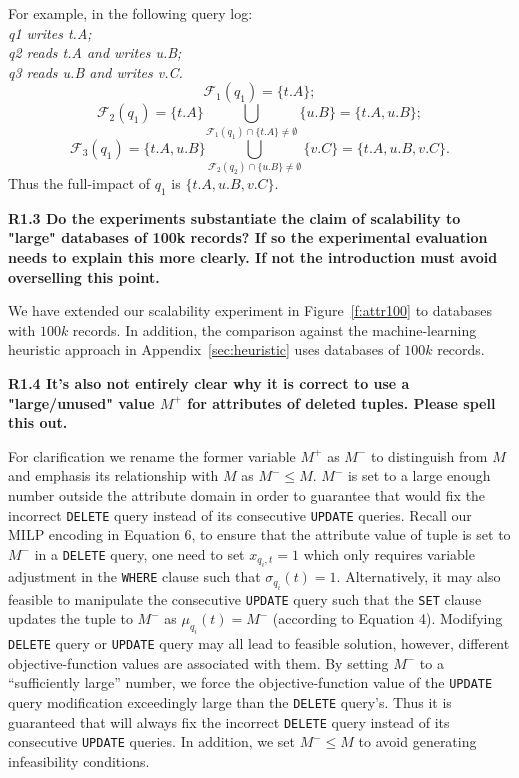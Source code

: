 \noindent For example, in the following query log:\\
\textit{q1 writes t.A; \\
q2 reads t.A and writes u.B; \\
q3 reads u.B and writes v.C.}\\
\[\mathcal{F}_1(q_1) = \{t.A\};\] 
\[\mathcal{F}_2(q_1) = \{t.A\} \bigcup_{\mathcal{F}_1(q_1) \cap \{t.A\} \neq \emptyset} \{u.B\} = \{t.A, u.B\};\]
\[\mathcal{F}_3(q_1) = \{t.A, u.B\}\bigcup_{\mathcal{F}_2(q_2) \cap \{u.B\} \neq \emptyset} \{v.C\} = \{t.A, u.B, v.C\}.\]
Thus the full-impact of $q_1$ is $\{t.A, u.B, v.C\}$.

\noindent \textbf{R1.3 Do the experiments substantiate the claim of scalability to "large" databases of 100k records? If so the experimental evaluation needs to explain this more clearly. If not the introduction must avoid overselling this point.}

We have extended our scalability experiment in Figure~\ref{f:attr100} to databases with $100k$ records. In addition, the comparison against the machine-learning heuristic approach in Appendix~\ref{sec:heuristic} uses databases of $100k$ records.

\noindent \textbf{R1.4 It's also not entirely clear why it is correct to use a "large/unused" value $M^+$ for attributes of deleted tuples. Please spell this out.}

For clarification we rename the former variable $M^+$ as $M^-$ to distinguish from $M$ and emphasis its relationship with $M$ as $M^- \leq M$. 
$M^-$ is set to a large enough number outside the attribute domain in order to guarantee that \sys would fix the incorrect \texttt{DELETE} query instead of its consecutive \texttt{UPDATE} queries. Recall our MILP encoding in Equation 6, to ensure that the attribute value of tuple is set to $M^-$ in a \texttt{DELETE} query, one need to set $x_{q_i,t} = 1$ which only requires variable adjustment in the \texttt{WHERE} clause such that $\sigma_{q_i}(t) = 1$. Alternatively, it may also feasible to manipulate the consecutive \texttt{UPDATE} query such that the \texttt{SET} clause updates the tuple to $M^-$ as $\mu_{q_i}(t) = M^-$ (according to Equation 4). Modifying \texttt{DELETE} query or \texttt{UPDATE} query may all lead to feasible solution, however, different objective-function values are associated with them. By setting $M^-$ to a ``sufficiently large'' number, we force the objective-function value of the \texttt{UPDATE} query modification exceedingly large than the \texttt{DELETE} query's. Thus it is  guaranteed that \sys will always fix the incorrect \texttt{DELETE} query instead of its consecutive \texttt{UPDATE} queries. In addition, we set $M^- \leq M$ to avoid generating infeasibility conditions.

